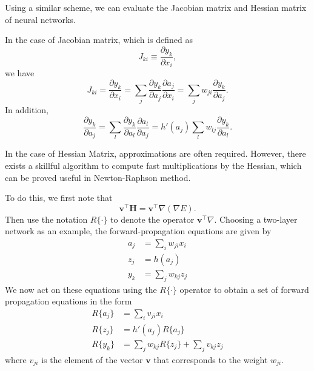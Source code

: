\documentclass[a4paper]{report}
\renewcommand{\bf}{\mathbf}
\begin{document}
Using a similar scheme, we can evaluate the Jacobian matrix and Hessian matrix of neural networks.

In the case of Jacobian matrix, which is defined as
\begin{equation}
	J_{ki} \equiv \frac{\partial y_k}{\partial x_i},
\end{equation}
we have 
\begin{equation}
	J_{ki} = \frac{\partial y_k}{\partial x_i} = \sum_j \frac{\partial y_k}{\partial a_j} \frac{\partial a_j}{\partial x_i}=\sum_j w_{ji} \frac{\partial y_k}{\partial a_j}.
\end{equation}
In addition,
\begin{equation}
	\frac{\partial y_k}{\partial a_j} = \sum_l \frac{\partial y_k}{\partial a_l}\frac{\partial a_l}{\partial a_j} = h'(a_j)\sum_l w_{lj}\frac{\partial y_k}{\partial a_l}.
\end{equation}

In the case of Hessian Matrix, approximations are often required. However, there exists a skillful algorithm to compute fast multiplications by the Hessian, which can be proved useful in Newton-Raphson method.

To do this, we first note that
\begin{equation}
	\bf{v}^{\intercal}\bf{H} = \bf{v}^{\intercal}\nabla (\nabla E).
\end{equation}
Then use the notation $R\{\cdot\}$ to denote the operator $\bf{v}^{\intercal} \nabla$. Choosing a two-layer network as an example, the forward-propagation equations are given by
\begin{align}
	a_j &= \sum_i w_{ji}x_i \\
	z_j &= h(a_j)\\
	y_k &= \sum_j w_{kj} z_j
\end{align}
We now act on these equations using the $R\{\cdot \}$ operator to obtain a set of forward propagation equations in the form
\begin{align}
	R\{ a_j\} &= \sum_i v_{ji} x_i \\
	R\{ z_j\} &= h'(a_j) R\{a_j\}\\
	R\{y_k\}  &= \sum_j w_{kj} R\{z_j\} + \sum_j v_{kj} z_j
\end{align}
where $v_{ji}$ is the element of the vector $\bf{v}$ that corresponds to the weight $w_{ji}$.
\end{document}

